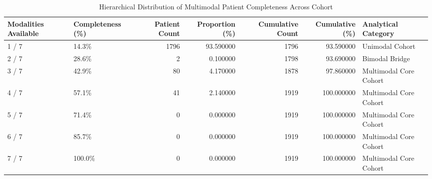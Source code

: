 \begin{table}
\caption{Hierarchical Distribution of Multimodal Patient Completeness Across Cohort}
\label{tab:table_p2_patient_completeness_distribution}
\begin{tabular}{llrrrrl}
\toprule
Modalities Available & Completeness (\%) & Patient Count & Proportion (\%) & Cumulative Count & Cumulative (\%) & Analytical Category \\
\midrule
1 / 7 & 14.3\% & 1796 & 93.590000 & 1796 & 93.590000 & Unimodal Cohort \\
2 / 7 & 28.6\% & 2 & 0.100000 & 1798 & 93.690000 & Bimodal Bridge \\
3 / 7 & 42.9\% & 80 & 4.170000 & 1878 & 97.860000 & Multimodal Core Cohort \\
4 / 7 & 57.1\% & 41 & 2.140000 & 1919 & 100.000000 & Multimodal Core Cohort \\
5 / 7 & 71.4\% & 0 & 0.000000 & 1919 & 100.000000 & Multimodal Core Cohort \\
6 / 7 & 85.7\% & 0 & 0.000000 & 1919 & 100.000000 & Multimodal Core Cohort \\
7 / 7 & 100.0\% & 0 & 0.000000 & 1919 & 100.000000 & Multimodal Core Cohort \\
\bottomrule
\end{tabular}
\end{table}
